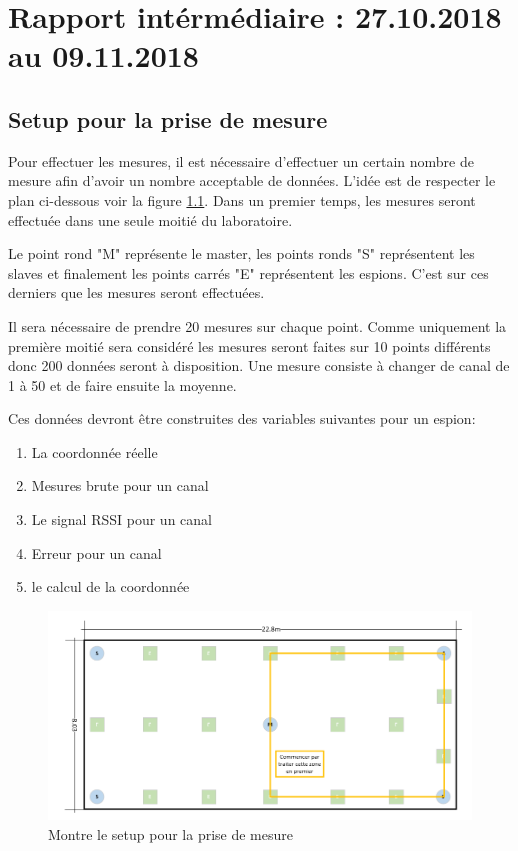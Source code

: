 \chapter{Rapport intérmédiaire : 27.10.2018 au 09.11.2018}

\section{Setup pour la prise de mesure}
Pour effectuer les mesures, il est nécessaire d'effectuer un certain nombre de mesure afin d'avoir un nombre acceptable de données. L'idée est de respecter le plan ci-dessous voir la figure \ref{fig:PlanMod}. Dans un premier temps, les mesures seront effectuée dans une seule moitié du laboratoire. 

Le point rond "M" représente le master, les points ronds "S" représentent les slaves et finalement les points carrés "E" représentent les espions. C'est sur ces derniers que les mesures seront effectuées. 

Il sera nécessaire de prendre 20 mesures sur chaque point. Comme uniquement la première moitié sera considéré les mesures seront faites sur 10 points différents donc 200 données seront à disposition. Une mesure consiste à changer de canal de 1 à 50 et de faire ensuite la moyenne. 

Ces données devront être construites des variables suivantes pour un espion: 
\begin{enumerate}
	\item La coordonnée réelle
	\item Mesures brute pour un canal
	\item Le signal RSSI pour un canal
	\item Erreur pour un canal
	\item le calcul de la coordonnée 
\end{enumerate}


\begin{figure}[H]
	\begin{center}
		\includegraphics[scale=0.5]{figures/PlanMod.PNG}
		\caption{Montre le setup pour la prise de mesure}
		\label{fig:PlanMod} %
	\end{center}
\end{figure}

